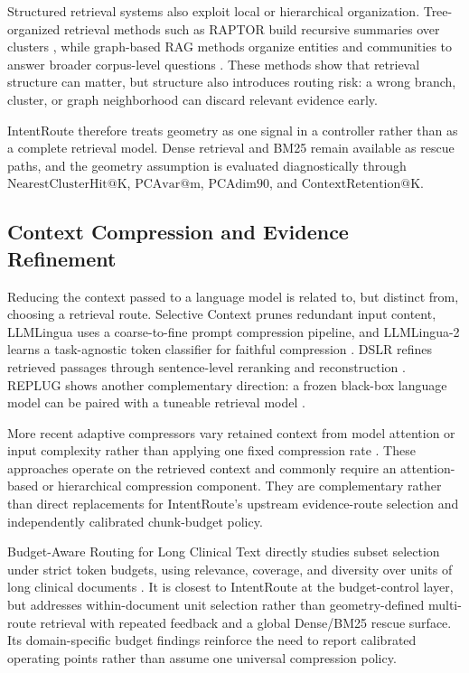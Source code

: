 Structured retrieval systems also exploit local or hierarchical organization. Tree-organized retrieval methods such as RAPTOR build recursive summaries over clusters \citep{sarthi2024raptor}, while graph-based RAG methods organize entities and communities to answer broader corpus-level questions \citep{edge2024graphrag}. These methods show that retrieval structure can matter, but structure also introduces routing risk: a wrong branch, cluster, or graph neighborhood can discard relevant evidence early.

IntentRoute therefore treats geometry as one signal in a controller rather than as a complete retrieval model. Dense retrieval and BM25 remain available as rescue paths, and the geometry assumption is evaluated diagnostically through $\mathrm{NearestClusterHit@K}$, $\mathrm{PCAvar@m}$, $\mathrm{PCAdim90}$, and $\mathrm{ContextRetention@K}$.

\subsection{Context Compression and Evidence Refinement}
\label{sec:03-related-work:context-compression-and-evidence-refinement}

Reducing the context passed to a language model is related to, but distinct from, choosing a retrieval route. Selective Context prunes redundant input content, LLMLingua uses a coarse-to-fine prompt compression pipeline, and LLMLingua-2 learns a task-agnostic token classifier for faithful compression \citep{li2023selectivecontext,jiang2023llmlingua,pan2024llmlingua2}. DSLR refines retrieved passages through sentence-level reranking and reconstruction \citep{hwang2024dslr}. REPLUG shows another complementary direction: a frozen black-box language model can be paired with a tuneable retrieval model \citep{shi2024replug}.

More recent adaptive compressors vary retained context from model attention or input complexity rather than applying one fixed compression rate \citep{luo2025attncomp,guo2025adaptivecompression}. These approaches operate on the retrieved context and commonly require an attention-based or hierarchical compression component. They are complementary rather than direct replacements for IntentRoute's upstream evidence-route selection and independently calibrated chunk-budget policy.

Budget-Aware Routing for Long Clinical Text directly studies subset selection under strict token budgets, using relevance, coverage, and diversity over units of long clinical documents \citep{qureshi2026budget}. It is closest to IntentRoute at the budget-control layer, but addresses within-document unit selection rather than geometry-defined multi-route retrieval with repeated feedback and a global Dense/BM25 rescue surface. Its domain-specific budget findings reinforce the need to report calibrated operating points rather than assume one universal compression policy.

